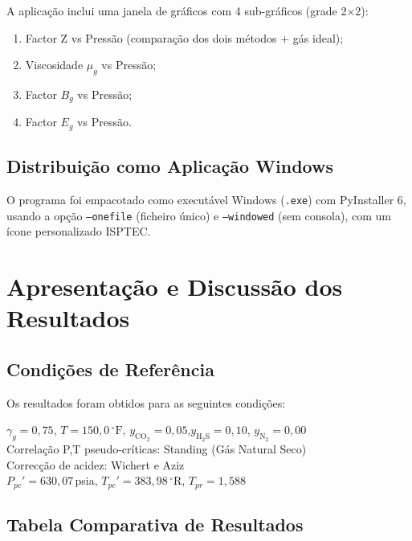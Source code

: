 \documentclass[12pt, a4paper]{article}
\begin{document}
A aplicação inclui uma janela de gráficos com 4 sub-gráficos (grade 2×2):
\begin{enumerate}
  \item Factor Z vs Pressão (comparação dos dois métodos + gás ideal);
  \item Viscosidade $\mu_g$ vs Pressão;
  \item Factor $B_g$ vs Pressão;
  \item Factor $E_g$ vs Pressão.
\end{enumerate}

\subsection{Distribuição como Aplicação Windows}

O programa foi empacotado como executável Windows (\texttt{.exe}) com PyInstaller 6,
usando a opção \texttt{--onefile} (ficheiro único) e \texttt{--windowed} (sem consola),
com um ícone personalizado ISPTEC.

\section{Apresentação e Discussão dos Resultados}

\subsection{Condições de Referência}

Os resultados foram obtidos para as seguintes condições:
\begin{defbox}
  $\gamma_g = 0{,}75$, \quad $T = 150{,}0\,^{\circ}\text{F}$,\quad
  $y_{\text{CO}_2} = 0{,}05$,\quad $y_{\text{H}_2\text{S}} = 0{,}10$,\quad
  $y_{\text{N}_2} = 0{,}00$\\[4pt]
  Correlação P,T pseudo-críticas: Standing (Gás Natural Seco)\\
  Correcção de acidez: Wichert e Aziz\\[4pt]
  $P_{pc}' = 630{,}07$\,psia, \quad $T_{pc}' = 383{,}98\,^{\circ}\text{R}$,
  \quad $T_{pr} = 1{,}588$
\end{defbox}

\subsection{Tabela Comparativa de Resultados}
\end{document}
